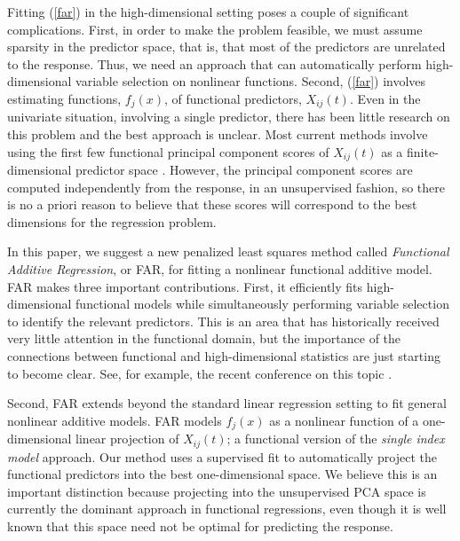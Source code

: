 \documentclass[aos,MSNbibl,dvips]{arximspdf}
\begin{document}
Fitting
(\ref{far}) in the high-dimensional setting poses
a couple of significant complications. First, in order to make the problem
feasible, we must assume sparsity in the predictor space, that is, that most
of the predictors are unrelated to the response.
Thus, we need an
approach that can automatically perform high-dimensional variable
selection on nonlinear functions. Second, (\ref{far}) involves
estimating functions, $f_j(x)$, of functional predictors, $X_{ij}(t)$.
Even in the
univariate situation, involving a single predictor, there has been little
research on this problem and the best approach is unclear. Most current methods
involve using the first few functional principal component scores of
$X_{ij}(t)$ as a finite-dimensional predictor space \cite{muller2}.
However, the principal component scores are computed independently from
the response, in an unsupervised fashion, so there is no a priori
reason to believe that these scores
will correspond to the best dimensions for the regression problem.

In this paper, we suggest a new penalized least squares method called
\emph{Functional Additive Regression}, or FAR, for fitting a
nonlinear functional additive model. FAR makes three important
contributions. First, it efficiently fits high-dimensional functional
models while simultaneously
performing variable selection to identify the relevant predictors. This
is an area
that has historically received very little attention in the functional
domain, but the importance of the connections between functional and
high-dimensional statistics are just starting to become clear. See, for
example, the recent conference on this topic \cite{Bongiorno1}.

Second,
FAR extends beyond the standard linear regression setting to fit general
nonlinear additive models.
FAR models $f_j(x)$ as a nonlinear function of a one-dimensional
linear projection of $X_{ij}(t)$; a functional version of the \emph
{single index model} approach. Our method uses a supervised fit to
automatically project the functional predictors into the best
one-dimensional space. We believe this is an important distinction
because projecting into the unsupervised PCA space is currently the
dominant approach in functional regressions, even
though it is well known that this space need not be optimal for
predicting the response.
\end{document}
